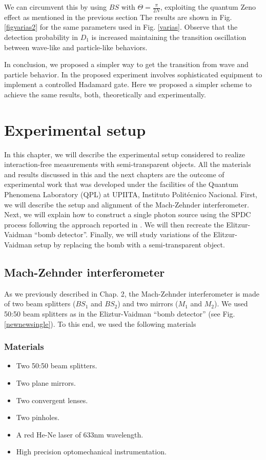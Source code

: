 \documentclass[12pt]{book}
\newcommand\blankpage{
    \null
    \thispagestyle{empty}
    \addtocounter{page}{0}
    \newpage
    }
\begin{document}
We can circumvent this by using $BS$ with $\Theta=\frac{\pi}{2N}$, exploiting the quantum Zeno effect as mentioned in the previous section The results are shown in Fig. \ref{figvarias2} for the same parameters used in Fig. \ref{varias}. Observe that the detection probability in $D_{1}$ is increased maintaining the transition oscillation between wave-like and particle-like behaviors.
                  



In conclusion, we proposed a simpler way to get the transition from wave and particle behavior. In \cite{Kaiser2012,Peruzzo} the proposed experiment involves sophisticated equipment to implement a controlled Hadamard gate. Here we proposed a simpler scheme to achieve the same results, both, theoretically and experimentally. 
\pagebreak

\blankpage


\chapter{Experimental setup}

In this chapter, we will describe the experimental setup considered to realize interaction-free measurements with semi-transparent objects. All the materials and results discussed in this and the next chapters are the outcome of experimental work that was developed under the facilities of the Quantum Phenomena Laboratory (QPL) at UPIITA, Instituto Politécnico Nacional. First, we will describe the setup and alignment of the Mach-Zehnder interferometer. Next, we will explain how to construct a single photon source using the SPDC process following the approach reported in \cite{maestria_procopio}. We will then recreate the Elitzur-Vaidman ``bomb detector''. Finally, we will study variations of the Elitzur-Vaidman setup by replacing the bomb with a semi-transparent object. 

\section{Mach-Zehnder interferometer}

As we previously described in Chap. 2, the Mach-Zehnder interferometer is made of two beam splitters ($BS_{1}$ and $BS_{2}$) and two mirrors ($M_{1}$ and $M_{2}$). We used 50:50 beam splitters as in the Eliztur-Vaidman ``bomb detector'' (see Fig. \ref{newnewsingle}). To this end, we  used the following materials

\subsection{Materials}
\begin{itemize}
\item Two 50:50 beam splitters.
\item Two plane mirrors.
\item Two convergent lenses.
\item Two pinholes.
\item A red He-Ne laser of 633nm wavelength.
\item High precision optomechanical instrumentation.
\end{itemize}
\end{document}
